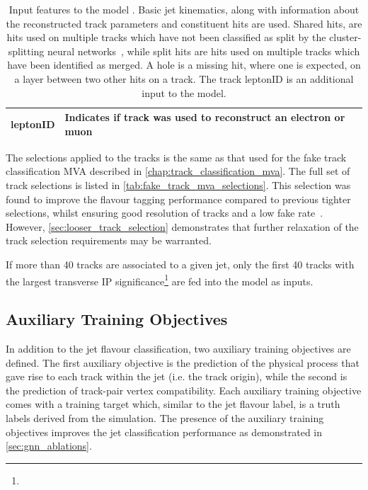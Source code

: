 \begin{table}[!htbp]
\begin{tabular}{ll}
    leptonID   & Indicates if track was used to reconstruct an electron or muon \\
    \hline\bottomrule
  \end{tabular}
  \caption{
    Input features to the \GNN model \cite{ATL-PHYS-PUB-2022-027}.
    Basic jet kinematics, along with information about the reconstructed track parameters and constituent hits are used.
    Shared hits, are hits used on multiple tracks which have not been classified as split by the cluster-splitting neural networks~\cite{PERF-2015-08}, while split hits are hits used on multiple tracks which have been identified as merged.
    A hole is a missing hit, where one is expected, on a layer between two other hits on a track.
    The track leptonID is an additional input to the \GNNLep model.
  }
  \label{tab:track_inputs}
\end{table}

The selections applied to the tracks is the same as that used for the fake track classification MVA described in \cref{chap:track_classification_mva}.
The full set of track selections is listed in \cref{tab:fake_track_mva_selections}.
This selection was found to improve the flavour tagging performance compared to previous tighter selections, whilst ensuring good resolution of tracks and a low fake rate~\cite{PERF-2015-08}.
However, \cref{sec:looser_track_selection} demonstrates that further relaxation of the track selection requirements may be warranted. 

If more than 40 tracks are associated to a given jet, only the first 40 tracks with the largest transverse IP significance\footnote{\ipdefsfootnote} \dzerosig are fed into the model as inputs.

\subsection{Auxiliary Training Objectives}\label{sec:aux-train-objectives}

In addition to the jet flavour classification, two auxiliary training objectives are defined.
The first auxiliary objective is the prediction of the physical process that gave rise to each track within the jet (i.e. the track origin), while the second is the prediction of track-pair vertex compatibility. 
Each auxiliary training objective comes with a training target which, similar to the jet flavour label, is a truth labels derived from the simulation.
The presence of the auxiliary training objectives improves the jet classification performance as demonstrated in \cref{sec:gnn_ablations}.


